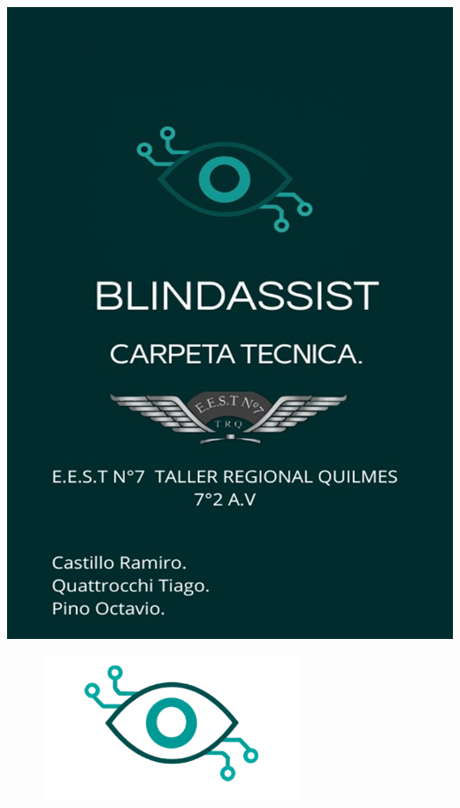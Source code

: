 \documentclass[12pt,a4paper]{article}
\begin{document}
\begingroup
\thispagestyle{empty}

\vspace*{-1.17in}
\noindent\hspace*{-1.02in}
\noindent\includegraphics[width=\paperwidth,height=\paperheight]{Carpeta tecnica/Imagen1.jpg}
\endgroup
\clearpage


\setcounter{page}{1}
\setcounter{tocdepth}{4} %
\setcounter{secnumdepth}{4}
\tableofcontents
    \begin{figure}[H]
    \centering %
    \includegraphics[width=0.7\linewidth]{Carpeta tecnica/logo indice.png} %
\end{figure}
\newpage
\end{document}
